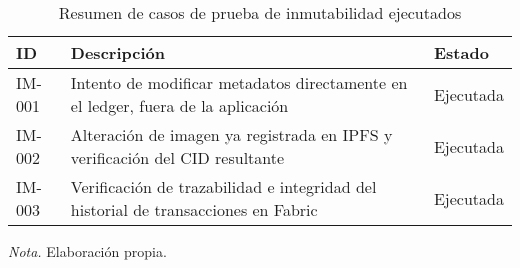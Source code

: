 \begin{table}[htbp]
    \centering
    \caption{Resumen de casos de prueba de inmutabilidad ejecutados}
    \begin{tabular}{|p{2cm}|p{6cm}|p{3cm}|}
        \hline
        \textbf{ID} & \textbf{Descripción} & \textbf{Estado} \\
        \hline
        IM-001 & Intento de modificar metadatos directamente en el ledger, fuera de la aplicación & Ejecutada \\
        \hline
        IM-002 & Alteración de imagen ya registrada en IPFS y verificación del CID resultante & Ejecutada \\
        \hline
        IM-003 & Verificación de trazabilidad e integridad del historial de transacciones en Fabric & Ejecutada \\
        \hline
    \end{tabular}
    \vspace{1em}
    \begin{flushleft}
        \textit{Nota.} Elaboración propia.
    \end{flushleft}
\end{table}
